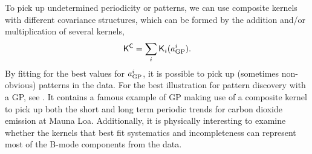 To pick up undetermined periodicity or patterns, 
we can use composite kernels with different covariance structures, 
which can be formed by the addition and/or multiplication of several kernels,
\begin{equation}
	\mathsf{K}^{\mathsf{C}} = \sum_i \mathsf{K}_i(a_{\rm GP}^i).
\end{equation}
By fitting for the best values for $a_{\rm GP}^i$, it is possible  
to pick up (sometimes non-obvious) patterns in the data. 
For the best illustration for pattern discovery with a GP, see
\cite{Duvenaud2013}.
It contains a famous example of GP making use of a composite kernel to pick up both the 
short and long term periodic trends for carbon dioxide emission at Mauna Loa.
Additionally, it is physically interesting to examine whether the kernels that best 
fit systematics and incompleteness can represent most of the B-mode components
from the data. 

% 
% 


